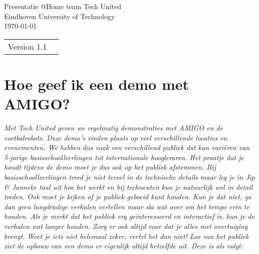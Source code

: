 \documentclass[a4paper,10pt]{article}
\numberwithin{equation}{section}
\numberwithin{figure}{section}
\numberwithin{table}{section}
\begin{document}
\begin{titlepage}

\begin{center}
\vspace{15mm}
\end{center}

\begin{figure}[H]
\centering
\end{figure}

\begin{center}
\vspace{10mm}
{\Huge Presentatie @Home team Tech United}\\
\vspace{3mm}
{\Large Eindhoven University of Technology}\\
\vspace{10mm}
\vspace{3mm}
\today
\end{center}

\vfill


\begin{tabular}{l l}
Version 1.1\\
\end{tabular}

\end{titlepage}

\section*{Hoe geef ik een demo met AMIGO?}
\textit{Met Tech United geven we regelmatig demonstraties met AMIGO en de voetbalrobots. Deze demo’s vinden plaats op veel verschillende locaties en evenementen. We hebben dus vaak een verschillend publiek dat kan vari\"eren van 5-jarige basisschoolleerlingen tot internationale hoogleraren. Het praatje dat je houdt tijdens de demo moet je dus ook op het publiek afstemmen. Bij basisschoolleerlingen treed je niet teveel in de technische details maar leg je in Jip \& Janneke taal uit hoe het werkt en bij techneuten kun je natuurlijk wel in detail treden. Ook moet je kijken of je publiek geboeid kunt houden. Kun je dat niet, ga dan geen langdradige verhalen vertellen maar sla wat over om het tempo erin te houden. Als je merkt dat het publiek erg ge\"interesseerd en interactief is, kun je de verhalen wat langer houden. Zorg er ook altijd voor dat je alles met overtuiging brengt. Weet je iets niet helemaal zeker, vertel het dan niet! Los van het publiek ziet de opbouw van een demo er eigenlijk altijd hetzelfde uit. Deze is als volgt:}
\end{document}
